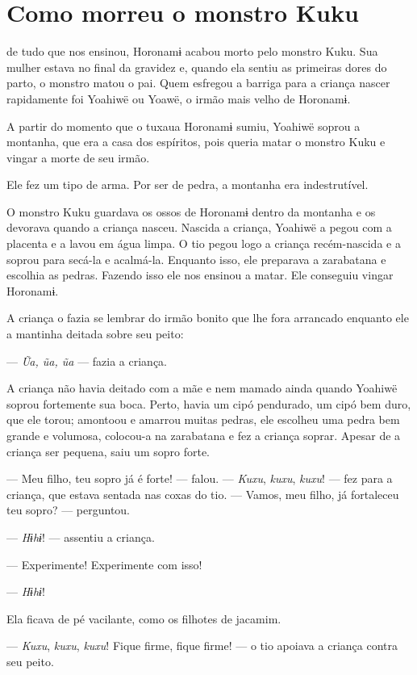 \chapter{Como morreu o monstro Kuku}

 de tudo que nos ensinou, Horonamɨ acabou morto pelo monstro Kuku.
Sua mulher estava no final da gravidez e, quando ela sentiu as primeiras
dores do parto, o monstro matou o pai. Quem esfregou a barriga para a
criança nascer rapidamente foi Yoahiwë ou Yoawë, o irmão mais velho de
Horonamɨ. 

A partir do momento que o tuxaua Horonamɨ sumiu, Yoahiwë soprou a
montanha, que era a casa dos espíritos, pois queria matar o monstro Kuku
e vingar a morte de seu irmão. 

Ele fez um tipo de arma. Por ser de pedra, a montanha era
indestrutível. 

O monstro Kuku guardava os ossos de Horonamɨ dentro da montanha e os
devorava quando a criança nasceu. Nascida a criança, Yoahiwë a pegou com
a placenta e a lavou em água limpa. O tio pegou logo a criança
recém-nascida e a soprou para secá-la e acalmá-la. Enquanto isso, ele
preparava a zarabatana e escolhia as pedras. Fazendo isso ele nos
ensinou a matar. Ele conseguiu vingar Horonamɨ. 

A criança o fazia se lembrar do irmão bonito que lhe fora arrancado
enquanto ele a mantinha deitada sobre seu peito:

--- \textit{Ũa, ũa, ũa} --- fazia a criança. 

A criança não havia deitado com a mãe e nem mamado ainda quando Yoahiwë
soprou fortemente sua boca. Perto, havia um cipó pendurado, um cipó bem
duro, que ele torou; amontoou e amarrou muitas pedras, ele escolheu uma
pedra bem grande e volumosa, colocou-a na zarabatana e fez a criança
soprar. Apesar de a criança ser pequena, saiu um sopro forte. 

--- Meu filho, teu sopro já é forte! --- falou. --- \textit{Kuxu}, \textit{kuxu},
\textit{kuxu}! --- fez para a criança, que estava sentada nas coxas do
tio. --- Vamos, meu filho, já fortaleceu teu sopro? --- perguntou.

--- \textit{Hɨhɨ}! --- assentiu a criança. 

--- Experimente! Experimente com isso! 

--- \textit{Hɨhɨ}! 

Ela ficava de pé vacilante, como os filhotes de jacamim. 

--- \textit{Kuxu}, \textit{kuxu}, \textit{kuxu}! Fique firme, fique firme! --- o tio apoiava a
criança contra seu peito. 

